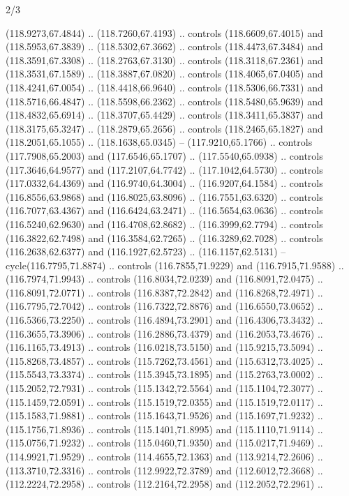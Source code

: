\begin{flagdescription}{2/3}
\begin{scope}[shift={(0.5\flaglength,0.5)},scale=\flagwidth/320]
\begin{scope}[y=0.8pt, x=0.8pt, yscale=-1,shift={(-118.3,-146)}]
  (118.9273,67.4844) .. (118.7260,67.4193) .. controls (118.6609,67.4015) and
  (118.5953,67.3839) .. (118.5302,67.3662) .. controls (118.4473,67.3484) and
  (118.3591,67.3308) .. (118.2763,67.3130) .. controls (118.3118,67.2361) and
  (118.3531,67.1589) .. (118.3887,67.0820) .. controls (118.4065,67.0405) and
  (118.4241,67.0054) .. (118.4418,66.9640) .. controls (118.5306,66.7331) and
  (118.5716,66.4847) .. (118.5598,66.2362) .. controls (118.5480,65.9639) and
  (118.4832,65.6914) .. (118.3707,65.4429) .. controls (118.3411,65.3837) and
  (118.3175,65.3247) .. (118.2879,65.2656) .. controls (118.2465,65.1827) and
  (118.2051,65.1055) .. (118.1638,65.0345) -- (117.9210,65.1766) .. controls
  (117.7908,65.2003) and (117.6546,65.1707) .. (117.5540,65.0938) .. controls
  (117.3646,64.9577) and (117.2107,64.7742) .. (117.1042,64.5730) .. controls
  (117.0332,64.4369) and (116.9740,64.3004) .. (116.9207,64.1584) .. controls
  (116.8556,63.9868) and (116.8025,63.8096) .. (116.7551,63.6320) .. controls
  (116.7077,63.4367) and (116.6424,63.2471) .. (116.5654,63.0636) .. controls
  (116.5240,62.9630) and (116.4708,62.8682) .. (116.3999,62.7794) .. controls
  (116.3822,62.7498) and (116.3584,62.7265) .. (116.3289,62.7028) .. controls
  (116.2638,62.6377) and (116.1927,62.5723) .. (116.1157,62.5131) --
  cycle(116.7795,71.8874) .. controls (116.7855,71.9229) and (116.7915,71.9588)
  .. (116.7974,71.9943) .. controls (116.8034,72.0239) and (116.8091,72.0475) ..
  (116.8091,72.0771) .. controls (116.8387,72.2842) and (116.8268,72.4971) ..
  (116.7795,72.7042) .. controls (116.7322,72.8876) and (116.6550,73.0652) ..
  (116.5366,73.2250) .. controls (116.4894,73.2901) and (116.4306,73.3432) ..
  (116.3655,73.3906) .. controls (116.2886,73.4379) and (116.2053,73.4676) ..
  (116.1165,73.4913) .. controls (116.0218,73.5150) and (115.9215,73.5094) ..
  (115.8268,73.4857) .. controls (115.7262,73.4561) and (115.6312,73.4025) ..
  (115.5543,73.3374) .. controls (115.3945,73.1895) and (115.2763,73.0002) ..
  (115.2052,72.7931) .. controls (115.1342,72.5564) and (115.1104,72.3077) ..
  (115.1459,72.0591) .. controls (115.1519,72.0355) and (115.1519,72.0117) ..
  (115.1583,71.9881) .. controls (115.1643,71.9526) and (115.1697,71.9232) ..
  (115.1756,71.8936) .. controls (115.1401,71.8995) and (115.1110,71.9114) ..
  (115.0756,71.9232) .. controls (115.0460,71.9350) and (115.0217,71.9469) ..
  (114.9921,71.9529) .. controls (114.4655,72.1363) and (113.9214,72.2606) ..
  (113.3710,72.3316) .. controls (112.9922,72.3789) and (112.6012,72.3668) ..
  (112.2224,72.2958) .. controls (112.2164,72.2958) and (112.2052,72.2961) ..

\end{scope}
\end{scope}
\end{flagdescription}
